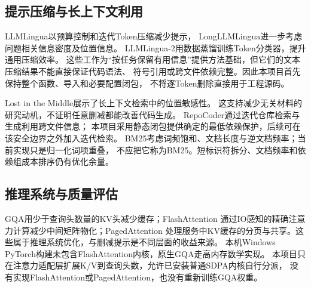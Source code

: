 \documentclass[UTF8,a4paper,11pt,fontset=fandol]{ctexart}
\begin{document}
\subsection{提示压缩与长上下文利用}
LLMLingua\cite{llmlingua}以预算控制和迭代Token压缩减少提示，
LongLLMLingua\cite{longllmlingua}进一步考虑问题相关信息密度及位置信息。
LLMLingua-2\cite{llmlingua2}用数据蒸馏训练Token分类器，提升通用压缩效率。
这些工作为“按任务保留有用信息”提供方法基础，但它们的文本压缩结果不能直接保证代码语法、
符号引用或跨文件依赖完整。因此本项目首先保持整个函数、导入和必要配置闭包，
不将逐Token删除直接用于工程源码。

Lost in the Middle\cite{lostmiddle}展示了长上下文检索中的位置敏感性。
这支持减少无关材料的研究动机，不证明任意删减都能改善代码生成。
RepoCoder\cite{repocoder}通过迭代仓库检索与生成利用跨文件信息；
本项目采用静态闭包提供确定的最低依赖保护，后续可在该安全边界之外加入迭代检索。
BM25\cite{bm25}考虑词频饱和、文档长度与逆文档频率；当前实现只是归一化词项重叠，
不应把它称为BM25。短标识符拆分、文档频率和依赖组成本排序仍有优化余量。

\subsection{推理系统与质量评估}
GQA\cite{gqa}用少于查询头数量的KV头减少缓存；FlashAttention\cite{flashattention}
通过IO感知的精确注意力计算减少中间矩阵物化；PagedAttention\cite{pagedattention}
处理服务中KV缓存的分页与共享。这些属于推理系统优化，与删减提示是不同层面的收益来源。
本机Windows PyTorch构建未包含FlashAttention内核，原生GQA走高内存数学实现。
本项目只在注意力适配层扩展K/V到查询头数，允许已安装普通SDPA内核自行分派\cite{sdpa,attentioninterface}，
没有实现FlashAttention或PagedAttention，也没有重新训练GQA权重。
\end{document}
